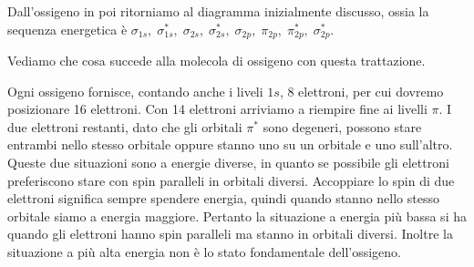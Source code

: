 \vspace{0.2cm}
Dall'ossigeno in poi ritorniamo al diagramma inizialmente discusso, ossia la sequenza energetica è $\sigma_{1s}, \; \sigma^*_{1s}, \; \sigma_{2s}, \; \sigma^*_{2s}, \; \sigma_{2p}, \; \pi_{2p}, \; \pi^*_{2p}, \; \sigma^*_{2p}$.

Vediamo che cosa succede alla molecola di ossigeno con questa trattazione.

Ogni ossigeno fornisce, contando anche i liveli $1s$, 8 elettroni, per cui dovremo posizionare 16 elettroni. Con 14 elettroni arriviamo a riempire fine ai livelli $\pi$. I due elettroni restanti, dato che gli orbitali $\pi^*$ sono degeneri, possono stare entrambi nello stesso orbitale oppure stanno uno su un orbitale e uno sull'altro. Queste due situazioni sono a energie diverse, in quanto se possibile gli elettroni preferiscono stare con spin paralleli in orbitali diversi. Accoppiare lo spin di due elettroni significa sempre spendere energia, quindi quando stanno nello stesso orbitale siamo a energia maggiore. Pertanto la situazione a energia più bassa si ha quando gli elettroni hanno spin paralleli ma stanno in orbitali diversi. Inoltre la situazione a più alta energia non è lo stato fondamentale dell'ossigeno.

